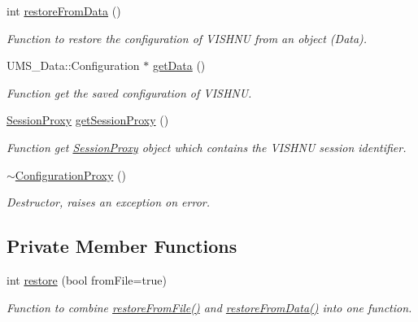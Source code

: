 \begin{DoxyCompactItemize}
int \hyperlink{classConfigurationProxy_a928c9e220845af6a169471f5d35aeb35}{restoreFromData} ()
\begin{DoxyCompactList}\small\item\em Function to restore the configuration of VISHNU from an object (Data). \item\end{DoxyCompactList}\item 
UMS\_\-Data::Configuration $\ast$ \hyperlink{classConfigurationProxy_a2f4b00c91144abd47d146835a44c4233}{getData} ()
\begin{DoxyCompactList}\small\item\em Function get the saved configuration of VISHNU. \item\end{DoxyCompactList}\item 
\hyperlink{classSessionProxy}{SessionProxy} \hyperlink{classConfigurationProxy_a4bf705d620244939cb8557a806b74daa}{getSessionProxy} ()
\begin{DoxyCompactList}\small\item\em Function get \hyperlink{classSessionProxy}{SessionProxy} object which contains the VISHNU session identifier. \item\end{DoxyCompactList}\item 
\hypertarget{classConfigurationProxy_a3e0aa7a462b6740c722e75caac0e2ff8}{
\hyperlink{classConfigurationProxy_a3e0aa7a462b6740c722e75caac0e2ff8}{$\sim$ConfigurationProxy} ()}
\label{classConfigurationProxy_a3e0aa7a462b6740c722e75caac0e2ff8}

\begin{DoxyCompactList}\small\item\em Destructor, raises an exception on error. \item\end{DoxyCompactList}\end{DoxyCompactItemize}
\subsection*{Private Member Functions}
\begin{DoxyCompactItemize}
\item 
int \hyperlink{classConfigurationProxy_a3c83af09aa3588da46c00ee5b05fb29b}{restore} (bool fromFile=true)
\begin{DoxyCompactList}\small\item\em Function to combine \hyperlink{classConfigurationProxy_a2f680f79eebe3969b5b5669908682ff0}{restoreFromFile()} and \hyperlink{classConfigurationProxy_a928c9e220845af6a169471f5d35aeb35}{restoreFromData()} into one function. \item\end{DoxyCompactList}\end{DoxyCompactItemize}
